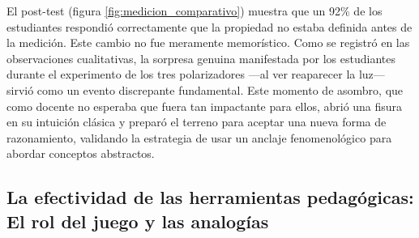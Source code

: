 \documentclass[10pt,a4paper]{article}
\begin{document}
El post-test (figura \ref{fig:medicion_comparativo}) muestra que un 92\% de los estudiantes respondió correctamente que la propiedad no estaba definida antes de la medición. Este cambio no fue meramente memorístico. Como se registró en las observaciones cualitativas, la sorpresa genuina manifestada por los estudiantes durante el experimento de los tres polarizadores —al ver reaparecer la luz— sirvió como un evento discrepante fundamental. Este momento de asombro, que como docente no esperaba que fuera tan impactante para ellos, abrió una fisura en su intuición clásica y preparó el terreno para aceptar una nueva forma de razonamiento, validando la estrategia de usar un anclaje fenomenológico para abordar conceptos abstractos.

\subsection{La efectividad de las herramientas pedagógicas: El rol del juego y las analogías}
\end{document}
